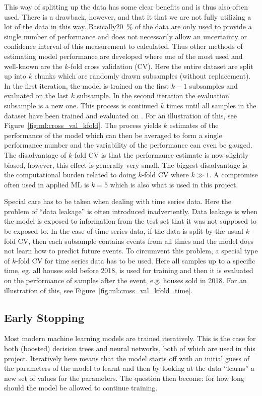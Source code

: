 \documentclass[a4paper, twoside, nobib]{tufte-book}
\newcommand{\q}[1]{``#1''}
\begin{document}
This way of splitting up the data has some clear benefits and is thus also often used. There is a drawback, however, and that it that we are not fully utilizing a lot of the data in this way. Basically\SI{20}{\percent} of the data are only used to provide a single number of performance and does not necessarily allow an uncertainty or confidence interval of this measurement to calculated. Thus other methods of estimating model performance are developed where one of the most used and well-known are the $k$-fold cross validation (CV). Here the entire dataset are split up into $k$ chunks which are randomly drawn subsamples (without replacement). In the first iteration, the model is trained on the first $k-1$ subsamples and evaluated on the last $k$ subsample. In the second iteration the evaluation subsample is a new one. This process is continued $k$ times until all samples in the dataset have been trained and evaluated on \citep{hastieElementsStatisticalLearning2009}. For an illustration of this, see Figure~\ref{fig:ml:cross_val_kfold}. The process yields $k$ estimates of the performance of the model which can then be averaged to form a single performance number and the variability of the performance can even be gauged. The disadvantage of $k$-fold CV is that the performance estimate is now slightly biased, however, this effect is generally very small. The biggest disadvantage is the computational burden related to doing $k$-fold CV where $k\gg 1$. A compromise often used in applied ML is $k=5$ which is also what is used in this project.  

Special care has to be taken when dealing with time series data. Here the problem of \q{data leakage} is often introduced inadvertently. Data leakage is when the model is exposed to information from the test set that it was not supposed to be exposed to. In the case of time series data, if the data is split by the usual $k$-fold CV, then each subsample contains events from all times and the model does not learn how to predict future events. To circumvent this problem, a special type of $k$-fold CV for time series data has to be used. Here all samples up to a specific time, eg. all houses sold before 2018, is used for training and then it is evaluated on the performance of samples after the event, e.g. houses sold in \num{2018}. For an illustration of this, see Figure~\ref{fig:ml:cross_val_kfold_time}.


\subsection{Early Stopping}
\label{subsec:early_stopping}
Most modern machine learning models are trained iteratively. This is the case for both (boosted) decision trees and neural networks, both of which are used in this project. Iteratively here means that the model starts off with an initial guess of the parameters of the model to learnt and then by looking at the data \q{learns} a new set of values for the parameters. The question then become: for how long should the model be allowed to continue training. 
\end{document}
